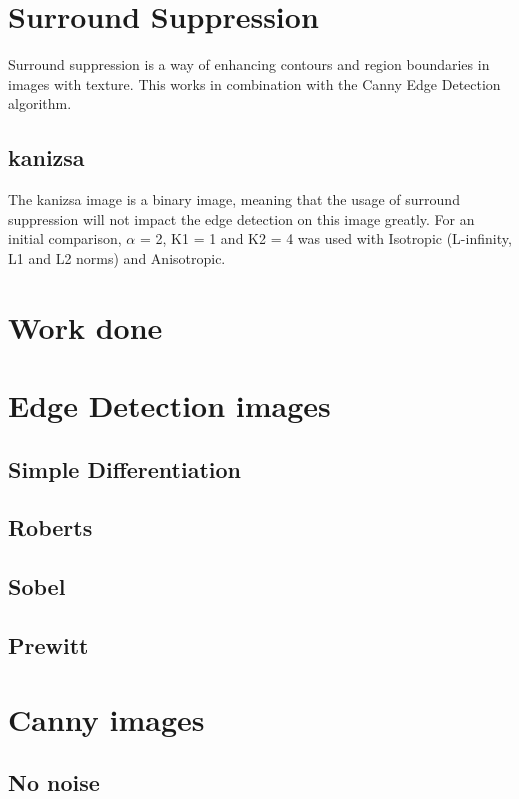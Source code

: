 \documentclass[10pt,a4paper]{article}
\begin{document}
\section{Surround Suppression}
Surround suppression is a way of enhancing contours and region boundaries in images with texture. This works in combination with the Canny Edge Detection algorithm.

\subsection{kanizsa}
The kanizsa image is a binary image, meaning that the usage of surround suppression will not impact the edge detection on this image greatly.
For an initial comparison, $\alpha$ = 2, K1 = 1 and K2 = 4 was used with Isotropic (L-infinity, L1 and L2 norms) and Anisotropic.

\section{Work done}

\section{Edge Detection images}
\subsection{Simple Differentiation}



\subsection{Roberts}


\subsection{Sobel}


\subsection{Prewitt}


\section{Canny images}
\subsection{No noise}

\end{document}

